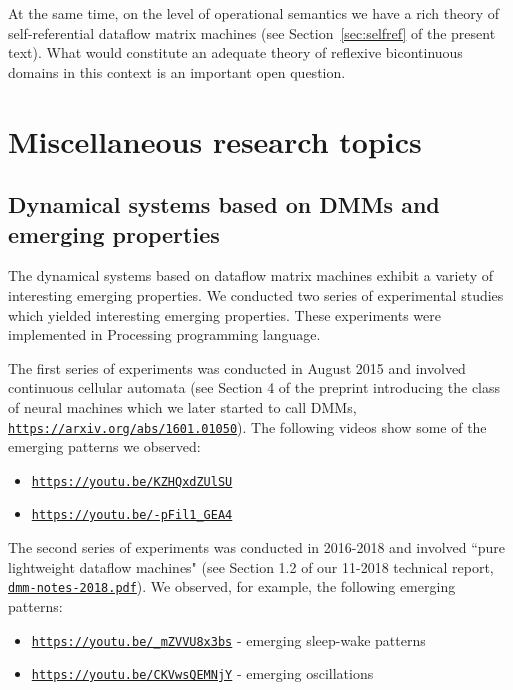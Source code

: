 \documentclass{article}
\begin{document}
At the same time, on the level of operational semantics we have a rich theory of self-referential dataflow
matrix machines (see Section~\ref{sec:selfref} of the present text). What would constitute an adequate theory of reflexive bicontinuous domains in this context is an important open question.

\section{Miscellaneous research topics}

\subsection{Dynamical systems based on DMMs and emerging properties}

The dynamical systems based on dataflow
matrix machines exhibit a variety of interesting emerging properties. We conducted two series of experimental studies which yielded interesting emerging properties. These experiments were implemented in Processing programming language.

The first series of experiments was conducted in August 2015 and involved continuous cellular automata (see Section 4 of the preprint introducing the class of neural machines which we later started to call DMMs, \href{https://arxiv.org/abs/1601.01050}{\tt https://arxiv.org/abs/1601.01050}). The following videos show some of the emerging patterns we observed:

\begin{itemize}
   \item \href{https://youtu.be/KZHQxdZUlSU}{\tt https://youtu.be/KZHQxdZUlSU}
   \item \href{https://youtu.be/-pFil1\_GEA4}{\tt https://youtu.be/-pFil1\_GEA4}
\end{itemize}

The second series of experiments was conducted in 2016-2018 and involved ``pure lightweight dataflow machines" (see Section 1.2 of our 11-2018 technical report, 
\href{https://www.cs.brandeis.edu/~bukatin/dmm-notes-2018.pdf}{\tt dmm-notes-2018.pdf}).
We observed, for example, the following emerging patterns:

\begin{itemize}
   \item \href{https://youtu.be/\_mZVVU8x3bs}{\tt https://youtu.be/\_mZVVU8x3bs} - emerging sleep-wake patterns
   \item \href{https://youtu.be/CKVwsQEMNjY}{\tt https://youtu.be/CKVwsQEMNjY} - emerging oscillations
\end{itemize}
\end{document}
